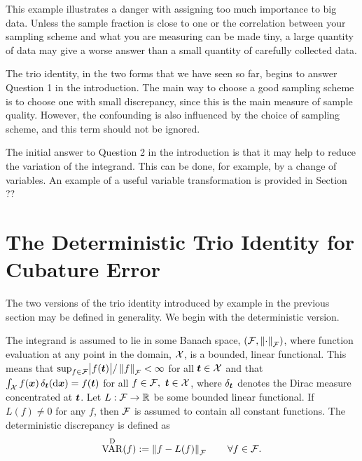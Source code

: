 \documentclass[graybox,footinfo]{svmult}
\DeclareMathOperator{\Var}{VAR}
\begin{document}
This example illustrates a danger with assigning too much importance to big data. Unless 
the 
sample fraction is close to one or the correlation between 
your sampling scheme and what you are measuring can be made tiny, a large quantity of 
data may give a worse answer than a small quantity of carefully collected data.

\begin{FJHLesson}
	\FJHLessonOne
\end{FJHLesson}

The trio identity, in the two forms that we have seen so far, begins to answer Question 1 
in the introduction.  The main way to choose a good sampling scheme is to choose one 
with small discrepancy, since this is the main measure of sample quality.   However, the 
confounding is also influenced by the choice of sampling scheme, and this term should 
not be ignored.

The initial answer to Question 2 in the introduction is that it may help to reduce the 
variation of the integrand.  This can be done, for example, by a change of variables.  An 
example of a useful variable transformation is provided in Section ??

\section{The Deterministic Trio Identity for Cubature Error} \label{FJH:sec:dettrio}
The two versions of the trio identity introduced by example in the previous section may 
be defined in generality. We begin with the deterministic version.  

The integrand is 
assumed to lie in some Banach space, $(\mathcal{F},\left \lVert \cdot \right \rVert_{\mathcal{F}})$, where function 
evaluation at any point  in the 
domain,  $\mathcal{X}$, is a 
bounded, linear functional.  This means that $\sup_{f \in \mathcal{F}} \bigl \lvert f({\boldsymbol{t}}) \bigr \rvert/\left \lVert f \right \rVert_{\mathcal{F}} < 
\infty$ for all ${\boldsymbol{t}} \in \mathcal{X}$ and that $\int_{\mathcal{X}} f({\boldsymbol{x}}) \, \delta_{{\boldsymbol{t}}}(\mathrm{d}{\boldsymbol{x}}) =f({\boldsymbol{t}})$ 
for all $f \in \mathcal{F}, \ {\boldsymbol{t}} \in \mathcal{X}$, where $\delta_{{\boldsymbol{t}}}$ denotes the Dirac measure 
concentrated at ${\boldsymbol{t}}$.  Let $L :\mathcal{F} \to {\mathbb{R}}$ be some bounded 
linear functional.  If $L(f) \ne 0$ for any $f$, then $\mathcal{F}$ is assumed to contain all 
constant functions.  The deterministic discrepancy is defined as 
\begin{equation}  \label{FJH:eq:detvardef}
\Var^{\Dt}(f) := \norm{f- L(f)}_{\cf} \qquad \forall f \in \cf.
\end{equation} 
\end{document}
